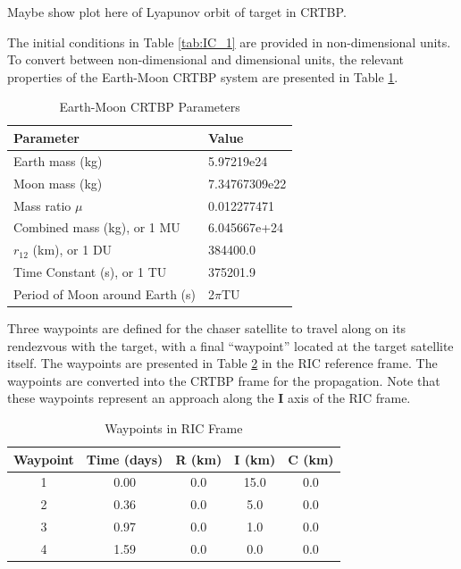 \documentclass[]{article}
\begin{document}
Maybe show plot here of Lyapunov orbit of target in CRTBP.

The initial conditions in Table \ref{tab:IC_1} are provided in non-dimensional units.  To convert between non-dimensional and dimensional units, the relevant properties of the Earth-Moon CRTBP system are presented in Table \ref{tab:Environment_1}.

\begin{table}[h] \label{tab:Environment_1}
	\begin{center}
		\begin{tabular}{l l}
			\toprule
			Parameter   & Value \\
			\midrule
			Earth mass (kg) & 5.97219e24 \\
			Moon mass (kg) & 7.34767309e22 \\
			Mass ratio \(\mu\)      & 0.012277471 \\
			Combined mass (kg), or 1 MU & 6.045667e+24 \\
			\(r_{12}\) (km), or 1 DU & 384400.0 \\
			Time Constant (s), or 1 TU & 375201.9 \\
			Period of Moon around Earth (s) & 2\(\pi\)TU \\
			\bottomrule
		\end{tabular}
		\caption{Earth-Moon CRTBP Parameters}
	\end{center}
\end{table}

Three waypoints are defined for the chaser satellite to travel along on its rendezvous with the target, with a final ``waypoint'' located at the target satellite itself.  The waypoints are presented in Table \ref{tab:Waypoints_1} in the RIC reference frame.  The waypoints are converted into the CRTBP frame for the propagation.  Note that these waypoints represent an approach along the \(\mathbf{I}\) axis of the RIC frame.  

\begin{table}[h] \label{tab:Waypoints_1}
	\begin{center}
		\begin{tabular}{ccccc}
			\toprule
			Waypoint   & Time (days) & R (km) & I (km) & C (km) \\
			\midrule
			1 & 0.00 & 0.0 & 15.0 & 0.0 \\
			2 & 0.36 & 0.0 & 5.0 & 0.0 \\
			3 & 0.97 & 0.0 & 1.0 & 0.0 \\
			4 & 1.59 & 0.0 & 0.0 & 0.0 \\
			\bottomrule
		\end{tabular}
		\caption{Waypoints in RIC Frame}
	\end{center}
\end{table}
\end{document}
